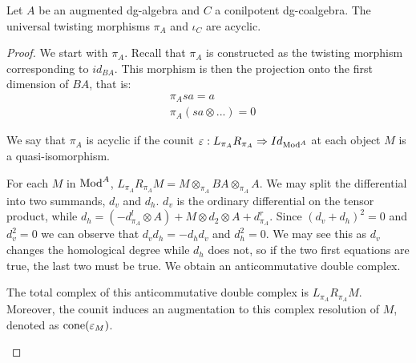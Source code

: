 \documentclass[../thesis.tex]{subfiles}
\begin{document}
            \begin{lemma}\label{lem: uni-twist-ac}
                Let $A$ be an augmented dg-algebra and $C$ a conilpotent dg-coalgebra. The universal twisting morphisms $\pi_A$ and $\iota_C$ are acyclic.
            \end{lemma}

            \begin{proof}
                We start with $\pi_A$. Recall that $\pi_A$ is constructed as the twisting morphism corresponding to $id_{BA}$. This morphism is then the projection onto the first dimension of $BA$, that is:
                \begin{align*}
                    & \pi_A{sa} = a \\
                    & \pi_A(sa\otimes ...) = 0
                \end{align*}

                We say that $\pi_A$ is acyclic if the counit $\varepsilon : L_{\pi_A}R_{\pi_A} \Rightarrow Id_{\tt{Mod}^A}$ at each object $M$ is a quasi-isomorphism.

                For each $M$ in $\tt{Mod}^A$, $L_{\pi_A}R_{\pi_A}M = M\otimes_{\pi_A}BA\otimes_{\pi_A}A$. We may split the differential into two summands, $d_v$ and $d_h$. $d_v$ is the ordinary differential on the tensor product, while $d_h = (-d^l_{\pi_A}\otimes A) + M\otimes d_2 \otimes A + d^r_{\pi_A}$. Since $(d_v + d_h)^2 = 0$ and $d_v^2 = 0$ we can observe that $d_vd_h = -d_hd_v$ and $d_h^2 = 0$. We may see this as $d_v$ changes the homological degree while $d_h$ does not, so if the two first equations are true, the last two must be true. We obtain an anticommutative double complex.
                \begin{center}
                \end{center}
                The total complex of this anticommutative double complex is $L_{\pi_A}R_{\pi_A}M$. Moreover, the counit induces an augmentation to this complex resolution of $M$, denoted as $\tt{cone}(\varepsilon_M)$. 
                \begin{center}
                \end{center}
                

\end{proof}
\end{document}
